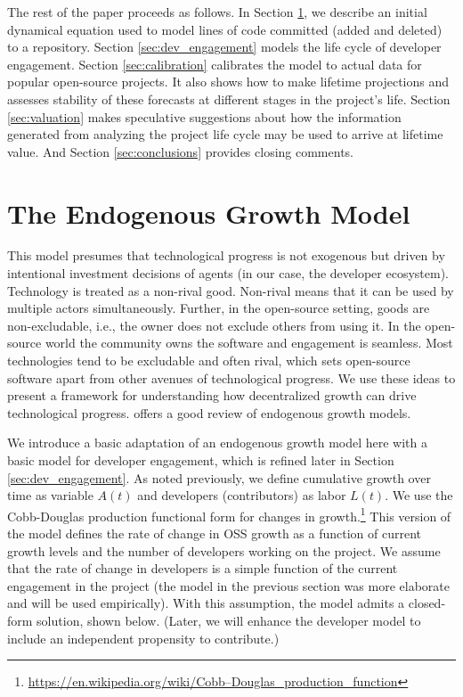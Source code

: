 \documentclass[conference]{IEEEtran}
\begin{document}
The rest of the paper proceeds as follows. In Section \ref{sec:endogenous_growth_model}, we describe an initial  dynamical equation used to model lines of code committed (added and deleted) to a repository. Section \ref{sec:dev_engagement} models the life cycle of developer engagement. Section \ref{sec:calibration} calibrates the model to actual data for popular open-source projects. It also shows how to make lifetime projections and assesses stability of these forecasts at different stages in the project's life. Section \ref{sec:valuation} makes speculative suggestions about how the information generated from analyzing the project life cycle may be used to arrive at lifetime value. And Section \ref{sec:conclusions} provides closing comments. 


\section{The Endogenous Growth Model}
\label{sec:endogenous_growth_model}

This model presumes that technological progress is not exogenous but driven by intentional investment decisions of agents (in our case, the developer ecosystem). Technology is treated as a non-rival good. Non-rival means that it can be used by multiple actors simultaneously. Further, in the open-source setting, goods are non-excludable, i.e., the owner does not exclude others from using it. In the open-source world the community owns the software and engagement is seamless. Most technologies tend to be excludable and often rival, which sets open-source software apart from other avenues of technological progress. We use these ideas to present a framework for understanding how decentralized growth can drive technological progress.  \cite{romer_origins_1994} offers a good review of endogenous growth models.

We introduce a basic adaptation of an endogenous growth model here with a basic model for developer engagement, which is refined later in Section \ref{sec:dev_engagement}. 
As noted previously, we define cumulative growth over time as variable $A(t)$ and developers (contributors) as labor $L(t)$. We use the Cobb-Douglas production functional form for changes in growth.\footnote{\url{https://en.wikipedia.org/wiki/Cobb–Douglas_production_function}} This version of the model defines the rate of change in OSS growth as a function of current growth levels and the number of developers working on the project. We assume that the rate of change in developers is a simple function of the current engagement in the project (the model in the previous section was more elaborate and will be used empirically). With this assumption, the model admits a closed-form solution, shown below. (Later, we will enhance the developer model to include an independent propensity to contribute.)
\end{document}
